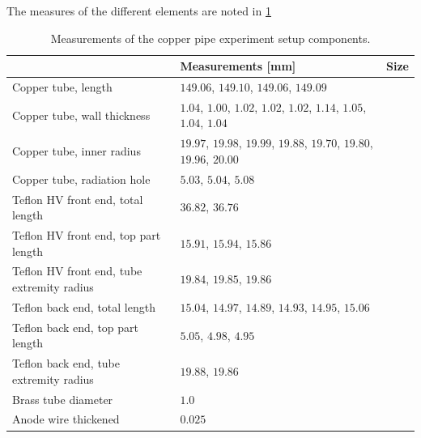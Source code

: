 The measures of the different elements are noted in \ref{Tab:coppercan_sizes}


\begin{table}[]
	\begin{tabular}{l|l|l}
		& Measurements {[}mm{]}                                                  & Size \\ \hline
		Copper tube, length                        & $149.06$, $149.10$, $149.06$, $149.09$                                 &      \\
		Copper tube, wall thickness                & $1.04$, $1.00$, $1.02$, $1.02$, $1.02$, $1.14$, $1.05$, $1.04$, $1.04$ &      \\
		Copper tube, inner radius                  & $19.97$, $19.98$, $19.99$, $19.88$, $19.70$, $19.80$, $19.96$, $20.00$ &      \\
		Copper tube, radiation hole                & $5.03$, $5.04$, $5.08$                                                 &      \\
		Teflon HV front end,  total length         & $36.82$, $36.76$                                                       &      \\
		Teflon HV front end, top part length       & $15.91$, $15.94$, $15.86$                                              &      \\
		Teflon HV front end, tube extremity radius & $19.84$, $19.85$, $19.86$                                              &      \\
		Teflon back end, total length              & $15.04$, $14.97$, $14.89$, $14.93$, $14.95$, $15.06$                   &      \\
		Teflon back end, top part length           & $5.05$, $4.98$, $4.95$                                                 &      \\
		Teflon back end, tube extremity radius     & $19.88$, $19.86$                                                       &      \\
		Brass tube diameter                        & $1.0$                                                                  &      \\
		Anode wire thickened                       & $0.025$                                                                &     
	\end{tabular}
\caption{Measurements of the copper pipe experiment setup components.}
\label{Tab:coppercan_sizes}
\end{table}